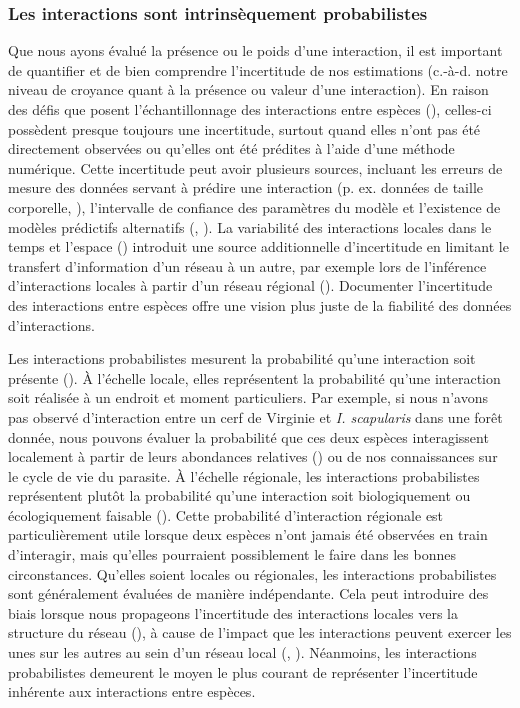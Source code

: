 \subsubsection{Les interactions sont intrinsèquement probabilistes} 

Que nous ayons évalué la présence ou le poids d'une interaction, il est
important de quantifier et de bien comprendre l'incertitude de nos estimations
(c.-à-d. notre niveau de croyance quant à la présence ou valeur d'une
interaction). En raison des défis que posent l'échantillonnage des interactions
entre espèces (\cite{Jordano2016Sampling}), celles-ci possèdent presque toujours
une incertitude, surtout quand elles n'ont pas été directement observées ou
qu'elles ont été prédites à l'aide d'une méthode numérique. Cette incertitude
peut avoir plusieurs sources, incluant les erreurs de mesure des données servant
à prédire une interaction (p. ex. données de taille corporelle,
\cite{Gravel2013Inferring}), l'intervalle de confiance des paramètres du modèle
et l'existence de modèles prédictifs alternatifs (\cite{Simmonds2022Insights},
\cite{Simmonds2024Recommendations}). La variabilité des interactions locales
dans le temps et l'espace (\cite{Poisot2015Species}) introduit une source
additionnelle d'incertitude en limitant le transfert d'information d'un réseau à
un autre, par exemple lors de l'inférence d'interactions locales à partir d'un
réseau régional (\cite{Dansereau2024Spatially}). Documenter l'incertitude des
interactions entre espèces offre une vision plus juste de la fiabilité des
données d'interactions. 

Les interactions probabilistes mesurent la probabilité qu'une interaction soit
présente (\cite{Poisot2016Structure}). À l'échelle locale, elles représentent la
probabilité qu'une interaction soit réalisée à un endroit et moment
particuliers. Par exemple, si nous n'avons pas observé d'interaction entre un
cerf de Virginie et \textit{I. scapularis} dans une forêt donnée, nous pouvons
évaluer la probabilité que ces deux espèces interagissent localement à partir de
leurs abondances relatives (\cite{Canard2014Empirical}) ou de nos connaissances
sur le cycle de vie du parasite. À l'échelle régionale, les interactions
probabilistes représentent plutôt la probabilité qu'une interaction soit
biologiquement ou écologiquement faisable (\cite{Strydom2023Grapha}). Cette
probabilité d'interaction régionale est particulièrement utile lorsque deux
espèces n'ont jamais été observées en train d'interagir, mais qu'elles
pourraient possiblement le faire dans les bonnes circonstances. Qu'elles soient
locales ou régionales, les interactions probabilistes sont généralement évaluées
de manière indépendante. Cela peut introduire des biais lorsque nous propageons
l'incertitude des interactions locales vers la structure du réseau
(\cite{Poisot2016Structure}), à cause de l'impact que les interactions peuvent
exercer les unes sur les autres au sein d'un réseau local
(\cite{Golubski2011Modifying}, \cite{Ims2013Indirect}). Néanmoins, les
interactions probabilistes demeurent le moyen le plus courant de représenter
l'incertitude inhérente aux interactions entre espèces.

